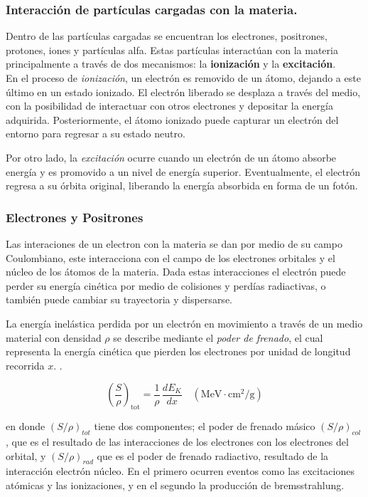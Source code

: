 \documentclass[onecolumn,12pt]{article} %
\begin{document}
\subsubsection{Interacción de partículas cargadas con la materia.}
Dentro de las partículas cargadas se encuentran los electrones, positrones, protones, iones y partículas alfa. Estas partículas interactúan con la materia principalmente a través de dos mecanismos: la \textbf{ionización} y la \textbf{excitación}.
\\
En el proceso de \textit{ionización}, un electrón es removido de un átomo, dejando a este último en un estado ionizado. El electrón liberado se desplaza a través del medio, con la posibilidad de interactuar con otros electrones y depositar la energía adquirida. Posteriormente, el átomo ionizado puede capturar un electrón del entorno para regresar a su estado neutro.

Por otro lado, la \textit{excitación} ocurre cuando un electrón de un átomo absorbe energía y es promovido a un nivel de energía superior. Eventualmente, el electrón regresa a su órbita original, liberando la energía absorbida en forma de un fotón.
\subsubsection*{Electrones y Positrones}

Las interaciones de un electron con la materia se dan por medio de su campo Coulombiano, este interacciona con el campo de los electrones orbitales y el núcleo de  los átomos de la materia. Dada estas interacciones el electrón puede perder su energía cinética  por medio de colisiones  y perdías radiactivas, o también puede cambiar su trayectoria y dispersarse. 

La energía inelástica perdida por un electrón en movimiento a través de un medio material con densidad $\rho$ se describe mediante el \textit{poder de frenado}, el cual representa la energía cinética que pierden los electrones por unidad de longitud recorrida $x$.  \cite{Podgorsak2005}.


\begin{equation}
    \left( \frac{S}{\rho} \right)_{\text{tot}} = \frac{1}{\rho} \, \frac{dE_K}{dx} \quad \left( \si{\mega\electronvolt\cdot\centi\meter\squared\per\gram} \right)
\end{equation}

en donde $(S/\rho)_{tot}$ tiene dos componentes;  el poder de frenado másico $(S/\rho)_{col}$, que es el resultado de  las interacciones de los electrones con los electrones del orbital, y $(S/\rho)_{rad}$  que es el poder de frenado radiactivo, resultado de la interacción electrón núcleo. En el primero ocurren eventos como las excitaciones atómicas y las ionizaciones, y en el segundo la producción de bremsstrahlung.
\end{document}
